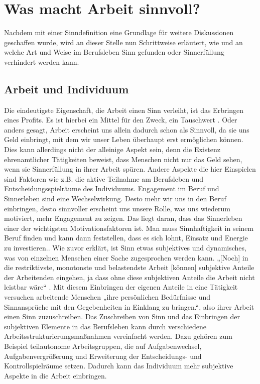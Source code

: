 \chapter{Was macht Arbeit sinnvoll?}
Nachdem mit einer Sinndefinition eine Grundlage für weitere Diskussionen geschaffen wurde, wird an dieser Stelle nun Schrittweise erläutert, wie und an welche Art und Weise im Berufsleben Sinn gefunden oder Sinnerfüllung verhindert werden kann. 
\section{Arbeit und Individuum}
Die eindeutigste Eigenschaft, die Arbeit einen Sinn verleiht, ist das Erbringen eines Profits. Es ist hierbei ein Mittel für den Zweck, ein Tauschwert \cite[S.192-193]{Voswinkel.2018}. Oder anders gesagt, Arbeit erscheint uns allein dadurch schon als Sinnvoll, da sie uns Geld einbringt, mit dem wir unser Leben überhaupt erst ermöglichen können. Dies kann allerdings nicht der alleinige Aspekt sein, denn die Existenz ehrenamtlicher Tätigkeiten beweist, dass Menschen nicht nur das Geld sehen, wenn sie Sinnerfüllung in ihrer Arbeit spüren. 
Andere Aspekte die hier Einspielen sind Faktoren wie z.B. die aktive Teilnahme am Berufsleben und Entscheidungsspielräume des Individuums. Engagement im Beruf und Sinnerleben sind eine Wechselwirkung. Desto mehr wir uns in den Beruf einbringen, desto sinnvoller erscheint uns unsere Rolle, was uns wiederum motiviert, mehr Engagement zu zeigen. Das liegt daran, dass das Sinnerleben einer der wichtigsten Motivationsfaktoren ist. Man muss Sinnhaftigkeit in seinem Beruf finden und kann dann feststellen, dass es sich lohnt, Einsatz und Energie zu investieren.\cite[S.205-206]{FluterHoffmann.2018}. Wie zuvor erklärt, ist Sinn etwas subjektives und dynamisches, was von einzelnen Menschen einer Sache zugesprochen werden kann. „[Noch] in die restriktivste, monotonste und belastendste Arbeit [können] subjektive Anteile der Arbeitenden eingehen, ja dass ohne diese subjektiven Anteile die Arbeit nicht leistbar wäre“ \cite[S.79]{SenghaasKnobloch.2008}. Mit diesem Einbringen der eigenen Anteile in eine Tätigkeit versuchen arbeitende Menschen „ihre persönlichen Bedürfnisse und Sinnansprüche mit den Gegebenheiten in Einklang zu bringen.“, also ihrer Arbeit einen Sinn zuzuschreiben\cite[S.66]{Freier.2018}. Das Zuschreiben von Sinn und das Einbringen der subjektiven Elemente in das Berufsleben kann durch verschiedene Arbeitsstrukturierungsmaßnahmen vereinfacht werden. Dazu gehören zum Beispiel teilautonome Arbeitsgruppen, die auf Aufgabenwechsel, Aufgabenvergrößerung und Erweiterung der Entscheidungs- und Kontrollspielräume setzen\cite[S.67]{Freier.2018}. Dadurch kann das Individuum mehr subjektive Aspekte in die Arbeit einbringen.
